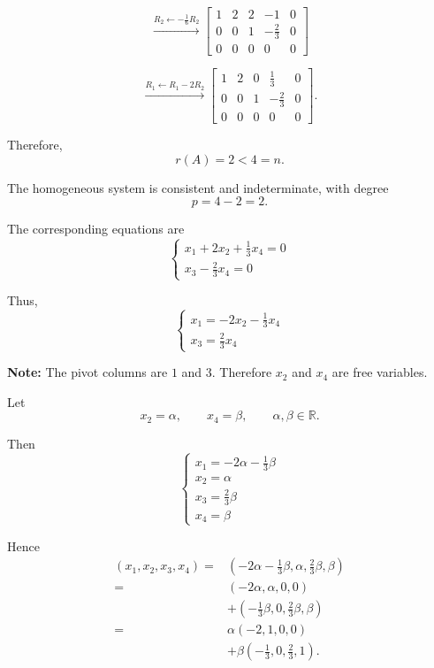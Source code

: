 \begin{enumerate}[label=\alph*)]
\begin{answer}
    $$
    \xrightarrow{R_2\leftarrow-\frac16R_2}
    \left[
    \begin{array}{cccc|c}
    1&2&2&-1&0\\
    0&0&1&-\frac23&0\\
    0&0&0&0&0
    \end{array}
    \right]
    $$

    $$
    \xrightarrow{R_1\leftarrow R_1-2R_2}
    \left[
    \begin{array}{cccc|c}
    1&2&0&\frac13&0\\
    0&0&1&-\frac23&0\\
    0&0&0&0&0
    \end{array}
    \right].
    $$

    Therefore,
    $$
    r(A)=2<4=n.
    $$

    The homogeneous system is consistent and indeterminate, with degree
    $$
    p=4-2=2.
    $$

    The corresponding equations are
    $$
    \begin{cases}
    x_1+2x_2+\frac13x_4=0\\
    x_3-\frac23x_4=0
    \end{cases}
    $$

    Thus,
    $$
    \begin{cases}
    x_1=-2x_2-\frac13x_4\\
    x_3=\frac23x_4
    \end{cases}
    $$

    {\color{red}
    \textbf{Note:} The pivot columns are $1$ and $3$.
    Therefore $x_2$ and $x_4$ are free variables.}

    Let
    $$
    x_2=\alpha,\qquad
    x_4=\beta,
    \qquad\alpha,\beta\in\mathbb R.
    $$

    Then
    $$
    \begin{cases}
    x_1=-2\alpha-\frac13\beta\\
    x_2=\alpha\\
    x_3=\frac23\beta\\
    x_4=\beta
    \end{cases}
    $$

    Hence
    $$
    \begin{aligned}
    (x_1,x_2,x_3,x_4)
    ={}&
    \left(-2\alpha-\frac13\beta,
    \alpha,\frac23\beta,\beta\right)\\
    ={}&
    (-2\alpha,\alpha,0,0)\\
    &+\left(-\frac13\beta,0,
    \frac23\beta,\beta\right)\\
    ={}&
    \alpha(-2,1,0,0)\\
    &+\beta\left(-\frac13,0,
    \frac23,1\right).
    \end{aligned}
    $$


\end{answer}
\end{enumerate}
